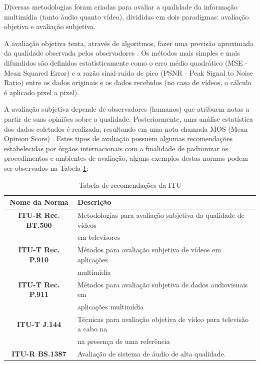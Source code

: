 Diversas metodologias foram criadas para avaliar a qualidade da informação multimídia (tanto áudio quanto vídeo), divididas em dois paradigmas: avaliação objetiva e avaliação subjetiva.

A avaliação objetiva tenta, através de algoritmos, fazer uma previsão aproximada da qualidade observada pelos observadores \cite{albini}. Os métodos mais simples e mais difundidos são definidos estatisticamente como o erro médio quadrático (MSE - Mean Squared Error) e a razão sinal-ruído de pico (PSNR - Peak Signal to Noise Ratio) \cite{emmersonsilva} entre os dados originais e os dados recebidos (no caso de vídeos, o cálculo é aplicado pixel a pixel).

A avaliação subjetiva depende de observadores (humanos) que atribuem notas a partir de suas opiniões sobre a qualidade. Posteriormente, uma análise estatística dos dados coletados é realizada, resultando em uma nota chamada MOS (Mean Opinion Score) \cite{itup930} \cite{albini}. Estes tipos de avaliação possuem algumas recomendações estabelecidas por órgãos internacionais com a finalidade de padronizar os procedimentos e ambientes de avaliação, alguns exemplos destas normas podem ser observados na Tabela \ref{tab:recomendacoes}:

\begin{table}
	\centering
	\caption{Tabela de recomendações da ITU}
	\label{tab:recomendacoes}
	\begin{tabular}{c|l}
		\hline
		\textbf{Nome da Norma} & Descrição \\
		\hline
		\textbf{ITU-R Rec. BT.500} & Metodologias para avaliação subjetiva da qualidade de vídeos \\
			& em televisores \\
		\textbf{ITU-T Rec. P.910} & Métodos para avaliação subjetiva de vídeos em aplicações \\
			& multimídia \\
		\textbf{ITU-T Rec. P.911} & Métodos para avaliação subjetiva de dados audiovisuais em \\
			& aplicações multimídia \\
		\textbf{ITU-T J.144} & Técnicas para avaliação objetiva de vídeo para televisão a cabo na \\
			& na presença de uma referência \\
		\textbf{ITU-R BS.1387} & Avaliação de sistema de áudio de alta qualidade. \\
		\hline
	\end{tabular}
\end{table}

